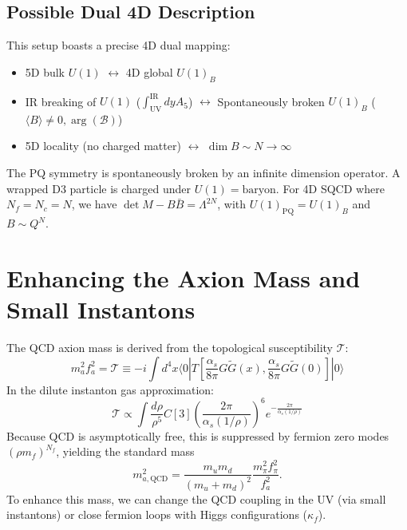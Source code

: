 \documentclass[11pt]{article}
\begin{document}
\subsection{Possible Dual 4D Description}
This setup boasts a precise 4D dual mapping:
\begin{itemize}
    \item 5D bulk $U(1)$ $\leftrightarrow$ 4D global $U(1)_B$
    \item IR breaking of $U(1)$ ($\int_{\text{UV}}^{\text{IR}} dy A_5$) $\leftrightarrow$ Spontaneously broken $U(1)_B$ ($\langle B \rangle \neq 0, \arg(\mathcal{B})$)
    \item 5D locality (no charged matter) $\leftrightarrow$ $\dim B \sim N \to \infty$
\end{itemize}
The PQ symmetry is spontaneously broken by an infinite dimension operator. A wrapped D3 particle is charged under $U(1) = \text{baryon}$. For 4D SQCD where $N_f = N_c = N$, we have $\det M - B\bar{B} = \Lambda^{2N}$, with $U(1)_{\text{PQ}} = U(1)_B$ and $B \sim Q^N$.

\section{Enhancing the Axion Mass and Small Instantons}
The QCD axion mass is derived from the topological susceptibility $\mathcal{T}$:
\begin{equation}
    m_a^2 f_a^2 = \mathcal{T} \equiv -i \int d^4x \langle 0 | T\left[ \frac{\alpha_s}{8\pi} G\tilde{G}(x), \frac{\alpha_s}{8\pi} G\tilde{G}(0) \right] | 0 \rangle
\end{equation}
In the dilute instanton gas approximation:
\begin{equation}
    \mathcal{T} \propto \int \frac{d\rho}{\rho^5} C[3] \left(\frac{2\pi}{\alpha_s(1/\rho)}\right)^6 e^{-\frac{2\pi}{\alpha_s(1/\rho)}}
\end{equation}
Because QCD is asymptotically free, this is suppressed by fermion zero modes $(\rho m_f)^{N_f}$, yielding the standard mass
\begin{equation}
    m_{a,\text{QCD}}^2 = \frac{m_u m_d}{(m_u + m_d)^2} \frac{m_\pi^2 f_\pi^2}{f_a^2}.
\end{equation}
To enhance this mass, we can change the QCD coupling in the UV (via small instantons) or close fermion loops with Higgs configurations ($\kappa_f$).
\end{document}
